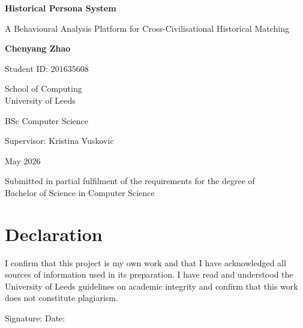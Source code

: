 \documentclass[11pt, a4paper]{report}
\begin{document}
\pagestyle{empty}

\begin{titlepage}
  \centering
  \vspace*{2cm}
  {\Huge\bfseries Historical Persona System\par}
  \vspace{0.5cm}
  {\large A Behavioural Analysis Platform for Cross-Civilisational Historical Matching\par}
  \vspace{2.5cm}
  {\large\bfseries Chenyang Zhao\par}
  \vspace{0.3cm}
  {\large Student ID: 201635608\par}
  \vspace{2cm}
  {\large School of Computing\\University of Leeds\par}
  \vspace{1cm}
  {\large BSc Computer Science\par}
  \vspace{1cm}
  {\large Supervisor: Kristina Vuskovic\par}
  \vspace{2cm}
  {\large May 2026\par}
  \vfill
  {\small Submitted in partial fulfilment of the requirements for the degree of\\
  Bachelor of Science in Computer Science}
\end{titlepage}

\chapter*{Declaration}

I confirm that this project is my own work and that I have acknowledged all sources of information used in its preparation. I have read and understood the University of Leeds guidelines on academic integrity and confirm that this work does not constitute plagiarism.

\vspace{2cm}
\noindent Signature: \underline{\hspace{6cm}} \quad Date: \underline{\hspace{3cm}}
\end{document}
